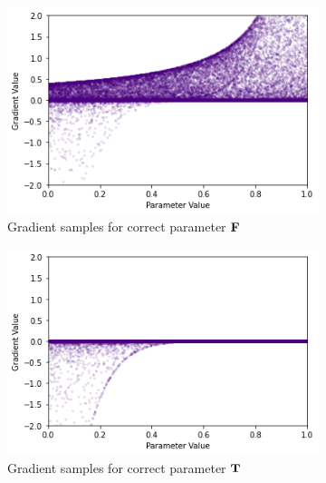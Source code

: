 \begin{figure}[h]
    \centering
    \begin{subfigure}[b]{0.47\textwidth}
        \centering
        \includegraphics[width=\textwidth]{imgs/grad_prod_10_falseparam.png}
        \caption{Gradient samples for correct parameter $\textbf{F}$}
        \label{fig:conjgrad10false}
    \end{subfigure}
    \begin{subfigure}[b]{0.47\textwidth}
        \centering
        \includegraphics[width=\textwidth]{imgs/grad_prod_10_trueparam.png}
        \caption{Gradient samples for correct parameter $\textbf{T}$}
        \label{fig:conjgrad10true}
    \end{subfigure}
    \begin{subfigure}[b]{0.47\textwidth}
        \centering

\end{subfigure}
\end{figure}
